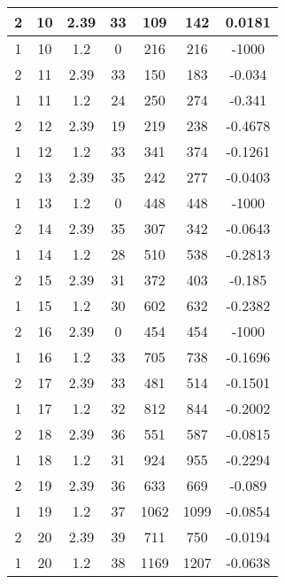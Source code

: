 \documentclass[letterpaper, 12pt]{article}
\begin{document}
\begin{longtable}{|c|c|c|c|c|c|c|}
\hline
2 & 10 & 2.39 & 33 & 109 & 142 & 0.0181 \\
\hline
1 & 10 & 1.2 & 0 & 216 & 216 & -1000 \\
\hline
2 & 11 & 2.39 & 33 & 150 & 183 & -0.034 \\
\hline
1 & 11 & 1.2 & 24 & 250 & 274 & -0.341 \\
\hline
2 & 12 & 2.39 & 19 & 219 & 238 & -0.4678 \\
\hline
1 & 12 & 1.2 & 33 & 341 & 374 & -0.1261 \\
\hline
2 & 13 & 2.39 & 35 & 242 & 277 & -0.0403 \\
\hline
1 & 13 & 1.2 & 0 & 448 & 448 & -1000 \\
\hline
2 & 14 & 2.39 & 35 & 307 & 342 & -0.0643 \\
\hline
1 & 14 & 1.2 & 28 & 510 & 538 & -0.2813 \\
\hline
2 & 15 & 2.39 & 31 & 372 & 403 & -0.185 \\
\hline
1 & 15 & 1.2 & 30 & 602 & 632 & -0.2382 \\
\hline
2 & 16 & 2.39 & 0 & 454 & 454 & -1000 \\
\hline
1 & 16 & 1.2 & 33 & 705 & 738 & -0.1696 \\
\hline
2 & 17 & 2.39 & 33 & 481 & 514 & -0.1501 \\
\hline
1 & 17 & 1.2 & 32 & 812 & 844 & -0.2002 \\
\hline
2 & 18 & 2.39 & 36 & 551 & 587 & -0.0815 \\
\hline
1 & 18 & 1.2 & 31 & 924 & 955 & -0.2294 \\
\hline
2 & 19 & 2.39 & 36 & 633 & 669 & -0.089 \\
\hline
1 & 19 & 1.2 & 37 & 1062 & 1099 & -0.0854 \\
\hline
2 & 20 & 2.39 & 39 & 711 & 750 & -0.0194 \\
\hline
1 & 20 & 1.2 & 38 & 1169 & 1207 & -0.0638 \\
\hline
\end{longtable}
\end{document}
